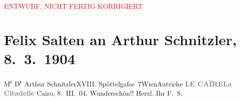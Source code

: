 
\begin{center}
            \textcolor{red}{ENTWURF, NICHT FERTIG KORRIGIERT}
                      \end{center}
            
         \renewcommand{\erwaehnteOrte}{Orte: Edmund-Weiß-Gasse, Kairo, Wien, XVIII., Währing, Zitadelle von Saladin, Österreich}
         \renewcommand{\erwaehnteWerke}{}
               \section[Felix Salten an Arthur Schnitzler, 8. 3. 1904]{ Felix Salten an Arthur Schnitzler, 8. 3. 1904}\nopagebreak{}\rehead{ }\begin{ledgroupsized}[t]{13cm}\normalsize\beginnumbering \toendnotes[C]{\smallbreak\pagebreak[2]} 
\pstart{}{\pb}M\textsuperscript{r} D\textsuperscript{r} Arthur Schnitzler\pend{}\pstart{}XVIII. Spöttelgaſse 7\pend{}\pstart{}Wien\pend{}\pstart{}Autriche\pend{}{\bigskip}\pstart
           \noindent{}{\pb}\textcolor{gray}{\textbf{LE CAÏRE}}\hfill \textcolor{gray}{\textbf{La Citadelle}}\pend
           \pstart
           Cairo, 8. III. 04.\pend
           \pstart
           Wunderschön!!\pend
           \pstart Herzl. Ihr \spacefill\mbox{F. S.}\pend{}
         
         \endnumbering{}\end{ledgroupsized}\begin{anhang}\end{anhang}\newcommand{\dateiname}{L03393}\newcommand{\titel}{Felix Salten an Arthur Schnitzler, 8. 3. 1904}\newcommand{\editorInnen}{Martin Anton Müller und Laura Untner}
      